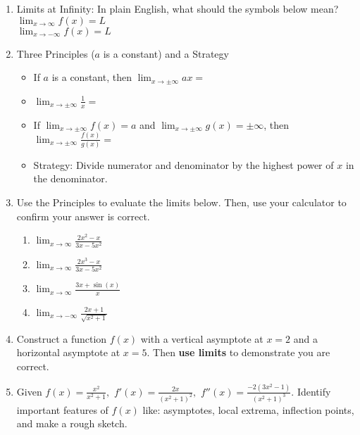 \documentclass[11pt,fleqn]{article}
\begin{document}
\setlength{\parindent}{0cm}
\renewcommand{\headrulewidth}{0pt}
\newcommand{\blank}[1]{\rule{#1}{0.75pt}}
\renewcommand{\d}{\displaystyle}
\vspace*{-0.7in}
\begin{center}
 {\large{ }}
\end{center}
 \begin{enumerate}
  \item Limits at Infinity: In plain English, what should the symbols below mean?\\
 
 $\displaystyle{\lim_{x \to \infty} f(x) = L }$ \\
 
 $\displaystyle{\lim_{x \to -\infty} f(x) = L }$\\
 
 \item Three Principles ($a$ is a constant) and a Strategy
 \begin{itemize}
 	\item If $a$ is a constant, then $\displaystyle{\lim_{x \to \pm\infty} ax=}$
 	\item $\displaystyle{\lim_{x \to \pm\infty} \frac{1}{x}=}$
	\item If $\displaystyle{\lim_{x \to \pm\infty} f(x)=a}$ and $\displaystyle{\lim_{x \to \pm\infty} {g(x)}= \pm \infty}$, then  $\displaystyle{\lim_{x \to \pm\infty} \frac{f(x)}{g(x)}=}$
	\item Strategy: Divide numerator and denominator by the highest power of $x$ in the denominator.
 \end{itemize}
 \item Use the Principles to evaluate the limits below. Then, use your calculator to confirm your answer is correct.
 	\begin{enumerate}
	\item $\displaystyle{\lim_{x \to \infty} \frac{2x^2-x}{3x-5x^2}}$
	\vfill	
	\item $\displaystyle{\lim_{x \to \infty} \frac{2x^3-x}{3x-5x^2}}$
	\vfill
	\item $\displaystyle{\lim_{x \to \infty} \frac{3x+ \sin(x)}{x}}$
	\vfill
	\item $\displaystyle{\lim_{x \to -\infty} \frac{2x+1}{\sqrt{x^2+1}}}$
	\vfill
	
		\end{enumerate}
 \newpage
 \item Construct a function $f(x)$ with a vertical asymptote at $x=2$ and a horizontal asymptote at $x=5.$ Then \textbf{use limits} to demonstrate you are correct.

 \vspace{2in}

 \item Given $f(x)=\frac{x^2}{x^2+1},$ $f'(x)=\frac{2x}{(x^2+1)^2},$ $f''(x)= \frac{-2(3x^2-1)}{(x^2+1)^3}.$  Identify important features of $f(x)$ like: asymptotes, local extrema, inflection points, and make a rough sketch.
 \vfill
 \end{enumerate}
\end{document}
